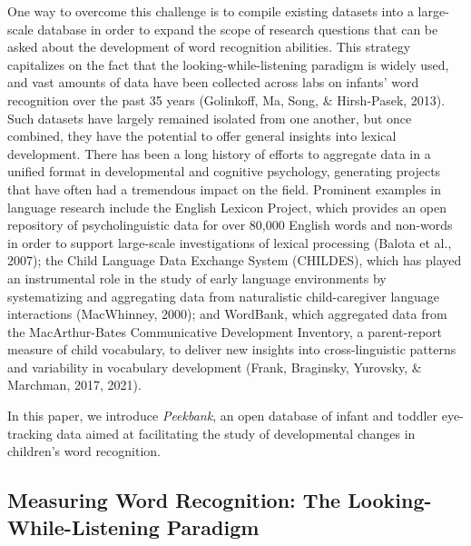 \documentclass[
  english,
  man,floatsintext]{apa6}
\begin{document}
One way to overcome this challenge is to compile existing datasets into a large-scale database in order to expand the scope of research questions that can be asked about the development of word recognition abilities.
This strategy capitalizes on the fact that the looking-while-listening paradigm is widely used, and vast amounts of data have been collected across labs on infants' word recognition over the past 35 years (Golinkoff, Ma, Song, \& Hirsh-Pasek, 2013).
Such datasets have largely remained isolated from one another, but once combined, they have the potential to offer general insights into lexical development.
There has been a long history of efforts to aggregate data in a unified format in developmental and cognitive psychology, generating projects that have often had a tremendous impact on the field.
Prominent examples in language research include the English Lexicon Project, which provides an open repository of psycholinguistic data for over 80,000 English words and non-words in order to support large-scale investigations of lexical processing (Balota et al., 2007); the Child Language Data Exchange System (CHILDES), which has played an instrumental role in the study of early language environments by systematizing and aggregating data from naturalistic child-caregiver language interactions (MacWhinney, 2000); and WordBank, which aggregated data from the MacArthur-Bates Communicative Development Inventory, a parent-report measure of child vocabulary, to deliver new insights into cross-linguistic patterns and variability in vocabulary development (Frank, Braginsky, Yurovsky, \& Marchman, 2017, 2021).

In this paper, we introduce \emph{Peekbank}, an open database of infant and toddler eye-tracking data aimed at facilitating the study of developmental changes in children's word recognition.

\hypertarget{measuring-word-recognition-the-looking-while-listening-paradigm}{%
\subsection{Measuring Word Recognition: The Looking-While-Listening Paradigm}\label{measuring-word-recognition-the-looking-while-listening-paradigm}}
\end{document}
